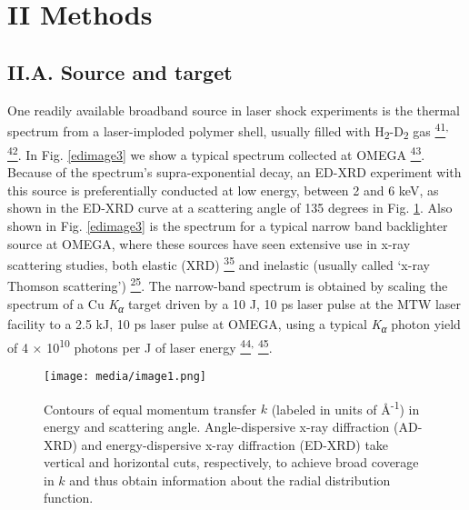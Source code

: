 \section{II Methods}\label{ii-methods}

\subsection{II.A. Source and target}

One readily available broadband source in laser shock experiments is the
thermal spectrum from a laser-imploded polymer shell, usually filled
with H\textsubscript{2}-D\textsubscript{2} gas
\hyperref[b.-r.-maddox-et-al.-physics-of-plasmas-18-056709-2011.]{\textsuperscript{41}}\textsuperscript{,}
\hyperref[b.-yaakobi-f.-j.-marshall-t.-r.-boehly-r.-p.-j.-town-and-d.-d.-meyerhofer-journal-of-the-optical-society-of-america-b-optical-physics-20-238-2003.]{\textsuperscript{42}}.
In Fig. \ref{edimage3} we show a typical spectrum collected at OMEGA
\hyperref[b.-yaakobi-2012-private-communication.]{\textsuperscript{43}}.
Because of the spectrum's supra-exponential decay, an ED-XRD experiment
with this source is preferentially conducted at low energy, between 2
and 6 keV, as shown in the ED-XRD curve at a scattering angle of 135
degrees in Fig. \ref{ed1}. Also shown in Fig. \ref{edimage3} is the spectrum for a typical
narrow band backlighter source at OMEGA, where these sources have seen
extensive use in x-ray scattering studies, both elastic (XRD)
\hyperref[t.-ma-et-al.-physical-review-letters-110-065001-2013.]{\textsuperscript{35}}
and inelastic (usually called `x-ray Thomson scattering')
\hyperref[s.-h.-glenzer-and-r.-redmer-reviews-of-modern-physics-81-1625-2009.]{\textsuperscript{25}}.
The narrow-band spectrum is obtained by scaling the spectrum of a Cu
\emph{K\textsubscript{α}} target driven by a 10 J, 10 ps laser pulse at
the MTW laser facility to a 2.5 kJ, 10 ps laser pulse at OMEGA, using a
typical \emph{K\textsubscript{α}} photon yield of 4 ×
10\textsuperscript{10} photons per J of laser energy
\hyperref[p.-m.-nilson-2012-private-communication.]{\textsuperscript{44}}\textsuperscript{,}
\hyperref[k.-u.-akli-et-al.-physics-of-plasmas-14-023102-2007.]{\textsuperscript{45}}.

\begin{figure}[h] \label{ed1}
\caption{ Contours of equal momentum transfer \(k\) (labeled in units of
Å\textsuperscript{-1}) in energy and scattering angle. Angle-dispersive
x-ray diffraction (AD-XRD) and energy-dispersive x-ray diffraction
(ED-XRD) take vertical and horizontal cuts, respectively, to achieve
broad coverage in \(k\) and thus obtain information about the radial
distribution function.}
\centering
\texttt{[image: media/image1.png]}
\end{figure}

